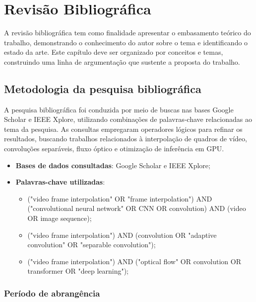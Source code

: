 \documentclass[
    12pt,                %
    openright,           %
    oneside,             %
    a4paper,             %
    english,             %
    brazil               %
]{abntex2}
\begin{document}
\chapter{Revisão Bibliográfica}
\label{cap:revisao}

A revisão bibliográfica tem como finalidade apresentar o embasamento teórico do trabalho, demonstrando o conhecimento do autor sobre o tema e identificando o estado da arte. Este capítulo deve ser organizado por conceitos e temas, construindo uma linha de argumentação que sustente a proposta do trabalho.

\section{Metodologia da pesquisa bibliográfica}
\label{sec:metodologia_pesquisa}

A pesquisa bibliográfica foi conduzida por meio de buscas nas bases Google Scholar e IEEE Xplore, utilizando combinações de palavras-chave relacionadas ao tema da pesquisa. As consultas empregaram operadores lógicos para refinar os resultados, buscando trabalhos relacionados à interpolação de quadros de vídeo, convoluções separáveis, fluxo óptico e otimização de inferência em GPU.

\begin{itemize}
    \item \textbf{Bases de dados consultadas}: Google Scholar e IEEE Xplore;

    \item \textbf{Palavras-chave utilizadas}: 
    \begin{itemize}
        \item ("video frame interpolation" OR "frame interpolation") AND ("convolutional neural network" OR CNN OR convolution) AND (video OR image sequence);
        \item ("video frame interpolation") AND (convolution OR "adaptive convolution" OR "separable convolution");
        \item ("video frame interpolation") AND ("optical flow" OR convolution OR transformer OR "deep learning");
    \end{itemize}
\end{itemize}

\subsection{Período de abrangência}
\end{document}

